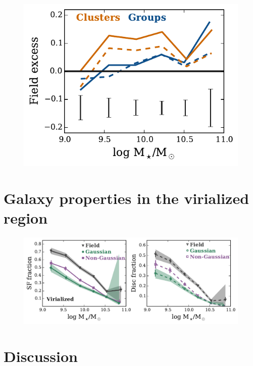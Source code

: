 \documentclass[a4paper,fleqn,usenatbib]{mnras}
\begin{document}
\begin{figure}
  \centering
  \includegraphics[width=\columnwidth]{mh_excess.pdf}
  \caption{}
  \label{fig:mh_excess}
\end{figure}


\section{Galaxy properties in the virialized region}
\label{sec:virial}

\begin{figure}
  \centering
  \includegraphics[width=\textwidth]{disk_sfFrac_w2_v.pdf}
  \caption{}
  \label{fig:disk_sfFrac_v}
\end{figure}


\section{Discussion}
\label{sec:discussion}
\end{document}
